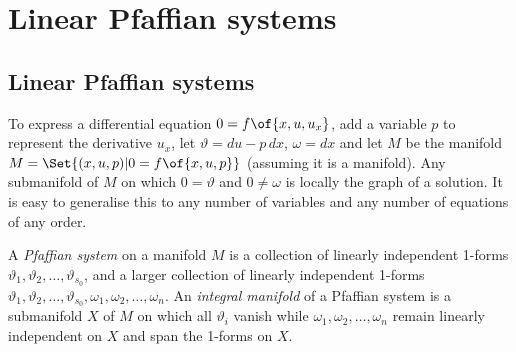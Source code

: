 \chapter{Linear Pfaffian systems}\label{chapter:linear.Pfaffian}%


\section{Linear Pfaffian systems}
To express a differential equation \(0=f\of{x,u,u_x}\), add a variable \(p\) to represent the derivative \(u_x\), let \(\vartheta=du-p \, dx\), \(\omega=dx\) and let \(M\) be the manifold \(M=\Set{(x,u,p)|0=f\of{x,u,p}}\) (assuming it is a manifold).
Any submanifold of \(M\) on which \(0=\vartheta\) and \(0\ne \omega\) is locally the graph of a solution.
It is easy to generalise this to any number of variables and any number of equations of any order.

A \emph{Pfaffian system} on a manifold \(M\) is a collection of linearly independent 1-forms  \(\vartheta_1, \vartheta_2, \dots, \vartheta_{s_0}\), and a larger collection of linearly independent 1-forms \(\vartheta_1, \vartheta_2, \dots, \vartheta_{s_0}, \omega_1, \omega_2, \dots, \omega_n\).
An \emph{integral manifold} of a Pfaffian system is a submanifold \(X\) of \(M\) on which all \(\vartheta_i\) vanish while \(\omega_1, \omega_2, \dots, \omega_n\) remain linearly independent on \(X\) and span the 1-forms on \(X\).

